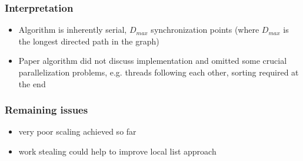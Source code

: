 \begin{frame}
 \frametitle{Interpretation}
 \begin{itemize}
	 \item Algorithm is inherently serial, $D_{max}$ synchronization points (where $D_{max}$ is the longest directed path in the graph)
	 \item Paper algorithm did not discuss implementation and omitted some crucial parallelization problems, e.g. threads following each other, sorting required at the end
 \end{itemize}
\end{frame}

\begin{frame}
 \frametitle{Remaining issues}
 \begin{itemize}
	 \item very poor scaling achieved so far
	 \item work stealing could help to improve local list approach
 \end{itemize}
\end{frame}


 
